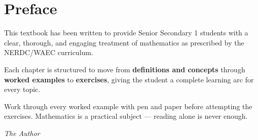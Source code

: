 
\chapter*{Preface}

This textbook has been written to provide Senior Secondary 1 students with a clear, thorough,
and engaging treatment of mathematics as prescribed by the NERDC/WAEC curriculum.

Each chapter is structured to move from \textbf{definitions and concepts} through
\textbf{worked examples} to \textbf{exercises}, giving the student a complete learning
arc for every topic.

\begin{notebox}
Work through every worked example with pen and paper before attempting the exercises.
Mathematics is a practical subject --- reading alone is never enough.
\end{notebox}

\vspace{1cm}
\hfill \textit{The Author}
